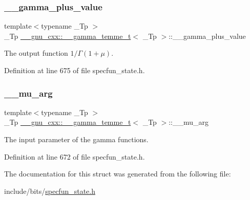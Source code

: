 \subsubsection{\texorpdfstring{\+\_\+\+\_\+gamma\+\_\+plus\+\_\+value}{\_\_gamma\_plus\_value}}
{\footnotesize\ttfamily template$<$typename \+\_\+\+Tp $>$ \\
\+\_\+\+Tp \hyperlink{struct____gnu__cxx_1_1____gamma__temme__t}{\+\_\+\+\_\+gnu\+\_\+cxx\+::\+\_\+\+\_\+gamma\+\_\+temme\+\_\+t}$<$ \+\_\+\+Tp $>$\+::\+\_\+\+\_\+gamma\+\_\+plus\+\_\+value}



The output function $ 1/\Gamma(1 + \mu) $. 



Definition at line 675 of file specfun\+\_\+state.\+h.

\mbox{\label{struct____gnu__cxx_1_1____gamma__temme__t_a841e7c549dd505de260018ddaa020565}} 
\subsubsection{\texorpdfstring{\+\_\+\+\_\+mu\+\_\+arg}{\_\_mu\_arg}}
{\footnotesize\ttfamily template$<$typename \+\_\+\+Tp $>$ \\
\+\_\+\+Tp \hyperlink{struct____gnu__cxx_1_1____gamma__temme__t}{\+\_\+\+\_\+gnu\+\_\+cxx\+::\+\_\+\+\_\+gamma\+\_\+temme\+\_\+t}$<$ \+\_\+\+Tp $>$\+::\+\_\+\+\_\+mu\+\_\+arg}



The input parameter of the gamma functions. 



Definition at line 672 of file specfun\+\_\+state.\+h.



The documentation for this struct was generated from the following file\+:\begin{DoxyCompactItemize}
\item 
include/bits/\hyperlink{specfun__state_8h}{specfun\+\_\+state.\+h}\end{DoxyCompactItemize}
